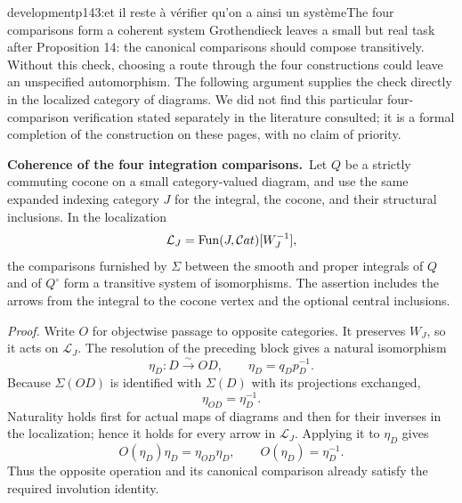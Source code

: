 \begin{dcomment}{development}{p143:et il reste à vérifier qu'on a ainsi un système}{The four comparisons form a coherent system}
Grothendieck leaves a small but real task after Proposition 14: the canonical comparisons should compose transitively. Without this check, choosing a route through the four constructions could leave an unspecified automorphism. The following argument supplies the check directly in the localized category of diagrams. We did not find this particular four-comparison verification stated separately in the literature consulted; it is a formal completion of the construction on these pages, with no claim of priority.

\textbf{Coherence of the four integration comparisons.}\ours\
Let $Q$ be a strictly commuting cocone on a small category-valued diagram, and use the same expanded indexing category $J$ for the integral, the cocone, and their structural inclusions. In the localization
\[
 \mathcal L_J=\operatorname{Fun}(J,\mathcal{C}at)[W_J^{-1}],
\]
the comparisons furnished by $\Sigma$ between the smooth and proper integrals of $Q$ and of $Q^\circ$ form a transitive system of isomorphisms. The assertion includes the arrows from the integral to the cocone vertex and the optional central inclusions.

\emph{Proof.} Write $O$ for objectwise passage to opposite categories. It preserves $W_J$, so it acts on $\mathcal L_J$. The resolution of the preceding block gives a natural isomorphism
\[
 \eta_D:D\xrightarrow{\sim}OD,
 \qquad \eta_D=q_Dp_D^{-1}.
\]
Because $\Sigma(OD)$ is identified with $\Sigma(D)$ with its projections exchanged,
\[
 \eta_{OD}=\eta_D^{-1}.
\]
Naturality holds first for actual maps of diagrams and then for their inverses in the localization; hence it holds for every arrow in $\mathcal L_J$. Applying it to $\eta_D$ gives
\[
 O(\eta_D)\eta_D=\eta_{OD}\eta_D,
 \qquad O(\eta_D)=\eta_D^{-1}.
\]
Thus the opposite operation and its canonical comparison already satisfy the required involution identity.


\end{dcomment}
